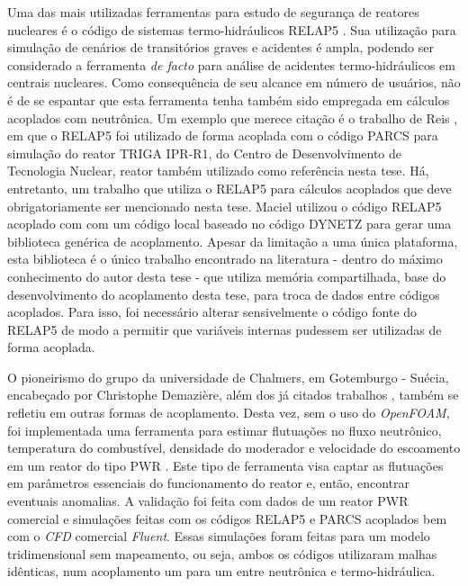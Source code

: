 Uma das mais utilizadas ferramentas para estudo de segurança de reatores nucleares é o
código de sistemas termo-hidráulicos RELAP5 \cite{Relap2003}. Sua utilização para simulação
de cenários de transitórios graves e acidentes é ampla, podendo ser considerado a
ferramenta \textit{de facto} para análise de acidentes termo-hidráulicos em centrais nucleares.
Como consequência de seu alcance em número de usuários, não é de se espantar que esta ferramenta
tenha também sido empregada em cálculos acoplados com neutrônica. Um exemplo que merece citação
é o trabalho de Reis \cite{Reis2015}, em que o RELAP5 foi utilizado de forma acoplada com
o código PARCS para simulação do reator TRIGA IPR-R1, do Centro de Desenvolvimento de
Tecnologia Nuclear, reator também utilizado como referência nesta tese. Há, entretanto, um
trabalho que utiliza o RELAP5 para cálculos acoplados que deve obrigatoriamente ser
mencionado nesta tese. Maciel \cite{Maciel2011} utilizou o código RELAP5 acoplado com
com um código local baseado no código DYNETZ para gerar uma biblioteca genérica de
acoplamento. Apesar da limitação a uma única plataforma, esta biblioteca é o único trabalho
encontrado na literatura - dentro do máximo conhecimento do autor desta tese - que utiliza
memória compartilhada, base do desenvolvimento do acoplamento desta tese, para troca
de dados entre códigos acoplados. Para isso, foi necessário alterar sensivelmente
o código fonte do RELAP5 de modo a permitir que variáveis internas pudessem ser utilizadas
de forma acoplada. 

O pioneirismo do grupo da universidade de Chalmers, em Gotemburgo - Suécia, encabeçado
por Christophe Demazière, além dos já citados trabalhos \cite{Jareteg2012, Jareteg2014},
também se refletiu em outras formas de acoplamento. Desta vez, sem o uso do \textit{OpenFOAM},
foi implementada uma ferramenta para estimar flutuações no fluxo neutrônico, temperatura
do combustível, densidade do moderador e velocidade do escoamento em um reator do tipo PWR
\cite{Larsson2012}. Este tipo de ferramenta visa captar as flutuações em parâmetros
essenciais do funcionamento do reator e, então, encontrar eventuais anomalias. A validação
foi feita com dados de um reator PWR comercial e simulações feitas com os códigos
RELAP5 e PARCS acoplados bem com o \textit{CFD} comercial \textit{Fluent}. Essas simulações
foram feitas para um modelo tridimensional sem mapeamento, ou seja, ambos os códigos
utilizaram malhas idênticas, num acoplamento um para um entre neutrônica e termo-hidráulica.

